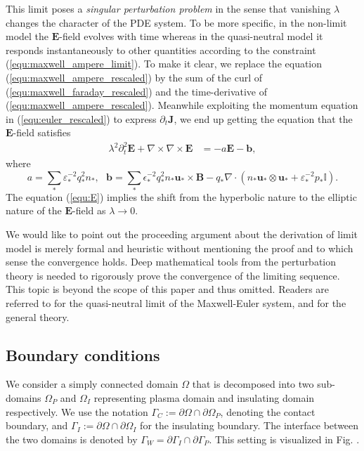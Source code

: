 \documentclass{article}
\begin{document}
This limit poses a \emph{singular perturbation problem} in the sense that vanishing $\lambda$ changes the character of the PDE system. To be more specific, in the non-limit model the $\mathbf{E}$-field evolves with time whereas in the quasi-neutral model it responds instantaneously to other quantities according to the constraint (\ref{equ:maxwell_ampere_limit}). To make it clear, we replace the equation (\ref{equ:maxwell_ampere_rescaled}) by the sum of the curl of (\ref{equ:maxwell_faraday_rescaled}) and the time-derivative of (\ref{equ:maxwell_ampere_rescaled}). Meanwhile exploiting the momentum equation in (\ref{equ:euler_rescaled}) to express $\partial_t\mathbf{J}$, we end up getting the equation that the $\mathbf{E}$-field satisfies
\begin{align}
    \lambda^2\partial_t^2 \mathbf{E} + \nabla \times \nabla \times \mathbf{E} &= - a\mathbf{E} - \mathbf{b}, \label{equ:E}
\end{align}
where
\begin{equation*}
    a = \sum_*\varepsilon_*^{-2}q_*^2n_*, \ \ \ \mathbf{b} = \sum_* \epsilon_*^{-2}q_*^2n_*\mathbf{u}_*\times\mathbf{B} - q_*\nabla\cdot(n_* \mathbf{u}_* \otimes \mathbf{u}_* + \varepsilon_*^{-2}p_*\mathbb{I}).
\end{equation*}
 The equation (\ref{equ:E}) implies the shift from the hyperbolic nature to the elliptic nature of the $\mathbf{E}$-field as $\lambda\rightarrow0$. 

We would like to point out the proceeding argument about the derivation of limit model is merely formal and heuristic without mentioning the proof and to which sense the convergence holds. Deep mathematical tools from the perturbation theory is needed to rigorously prove the convergence of the limiting sequence. This topic is beyond the scope of this paper and thus omitted. Readers are referred to \cite{remi_2014} for the quasi-neutral limit of the Maxwell-Euler system, and \cite{mark_1995} for the general theory.

\subsection{Boundary conditions}

We consider a simply connected domain $\Omega$ that is decomposed into two sub-domains $\Omega_P$ and $\Omega_I$ representing plasma domain and insulating domain respectively. We use the notation $\Gamma_C := \partial\Omega \cap \partial\Omega_P$, denoting the contact boundary, and $\Gamma_I := \partial\Omega \cap \partial\Omega_I$ for the insulating boundary. The interface between the two domains is denoted by $\Gamma_W = \partial\Gamma_I \cap \partial\Gamma_P$. This setting is visualized in Fig. . 
\end{document}
